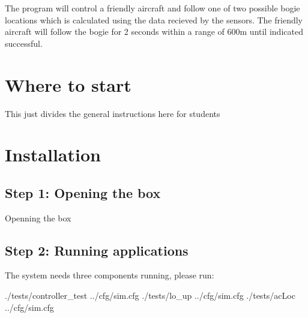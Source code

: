 The program will control a friendly aircraft and follow one of two possible bogie locations which is calculated using the data recieved by the sensors. The friendly aircraft will follow the bogie for 2 seconds within a range of 600m until indicated successful.\hypertarget{index_ac_doc_index_more_info}{}\section{Where to start}\label{index_ac_doc_index_more_info}

\begin{DoxyItemize}
\item This just divides the general instructions here for students
\end{DoxyItemize}\hypertarget{index_ac_doc_install}{}\section{Installation}\label{index_ac_doc_install}
\hypertarget{index_ac_doc_step1}{}\subsection{Step 1\+: Opening the box}\label{index_ac_doc_step1}
Openning the box\hypertarget{index_ac_doc_step2}{}\subsection{Step 2\+: Running applications}\label{index_ac_doc_step2}
The system needs three components running, please run\+:

\begin{DoxyVerb}./tests/controller_test ../cfg/sim.cfg
./tests/lo_up ../cfg/sim.cfg
./tests/acLoc ../cfg/sim.cfg\end{DoxyVerb}
 
